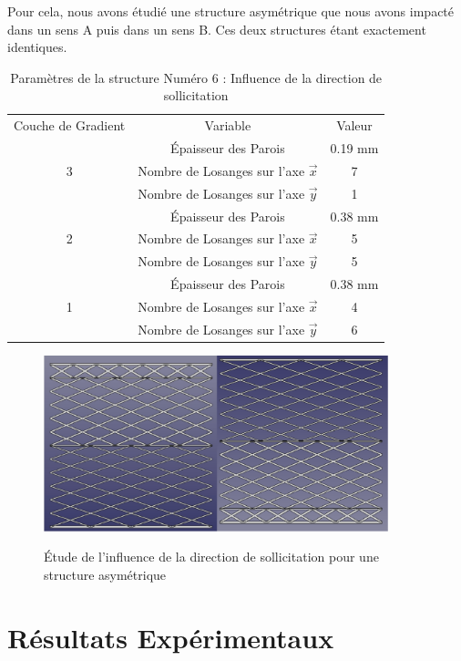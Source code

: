 \documentclass[a4paper]{article}
\begin{document}
	Pour cela, nous avons étudié une structure asymétrique que nous avons impacté dans un sens A puis dans un sens B. Ces deux structures étant exactement identiques.
	
	\begin{table}[H]
		\centering
		\begin{tabular}{|c|c|c|}
			\hline
			\rowcolor{Gray}
			\multicolumn{3}{c}{Structure asymétrique : Structure 6}\\\hline
			\rowcolor{Gray}
			Couche de Gradient & Variable & Valeur\\
			\hline\hline
			& Épaisseur des Parois & 0.19 mm\\
			3 & Nombre de Losanges sur l'axe $\vec{x}$ & 7\\
			& Nombre de Losanges sur l'axe $\vec{y}$ & 1\\
			\hline
			& Épaisseur des Parois & 0.38 mm\\
			2 & Nombre de Losanges sur l'axe $\vec{x}$ & 5\\
			& Nombre de Losanges sur l'axe $\vec{y}$ & 5\\
			\hline
			& Épaisseur des Parois & 0.38 mm\\
			1 & Nombre de Losanges sur l'axe $\vec{x}$ & 4\\
			& Nombre de Losanges sur l'axe $\vec{y}$ & 6\\
			\hline
		\end{tabular}
		\caption{Paramètres de la structure Numéro 6 : Influence de la direction de sollicitation}
	\end{table}
	
	\begin{figure}[H]
		\centering
		\includegraphics[width=10cm]{Images/6/directsol/directsol.pdf}\\
		\caption{Étude de l'influence de la direction de sollicitation pour une structure asymétrique}
	\end{figure}
	\newpage
	
	\section{Résultats Expérimentaux}
\end{document}
